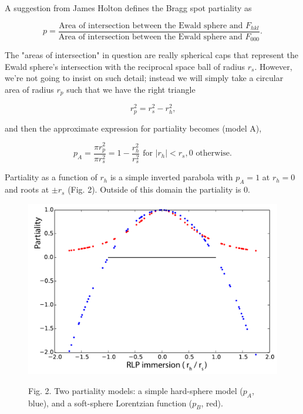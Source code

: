 \documentclass[12pt, letterpaper]{article}
\begin{document}
\par A suggestion from James Holton defines the Bragg spot partiality as
  
  \begin{equation}
    p = \frac{\text{Area of intersection between the Ewald sphere and } F_{hkl}}
             {\text{Area of intersection between the Ewald sphere and } F_{000}}
    \text{.}
    \label{eqn:part}
  \end{equation}
  
The "areas of intersection" in question are really spherical caps that represent the Ewald 
sphere's intersection with the reciprocal space ball of radius $r_s$.  However, we're not going to 
insist on such detail; instead we will simply take a circular area of radius $r_p$ such that we
have the right triangle

  \begin{equation}
    {r}_p^2 = {r}_s^2 - {r}_h^2
    \text{,}
    \label{eqn:pyth}
  \end{equation}

and then the approximate expression for partiality becomes (model A),

  \begin{equation}
    p_A = \frac{\pi r_p^2}{\pi r_s^2} = 1 - \frac{r_h^2}{r_s^2} \text{ for }|r_h|<r_s, 0 \text{ otherwise}
    \text{.}
    \label{eqn:fexprr}
  \end{equation}

Partiality as a function of $r_h$ is a simple inverted parabola with $p_A=1$ at $r_h=0$ and 
roots at $\pm r_s$ (Fig. 2).  Outside of this domain the partiality is 0. 

  \begin{figure}[htb!]
  \begin{center}
  \includegraphics[scale=0.65]{Figure_2.pdf}
  \label{fig:2}
  \end{center}
  \begin{center}
  {Fig. 2. Two partiality models:  a simple hard-sphere model ($p_A$, blue), and a soft-sphere Lorentzian
  function ($p_B$, red).}
  \end{center}
  \end{figure}
\end{document}
